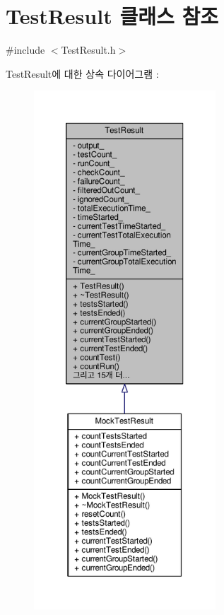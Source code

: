 \hypertarget{class_test_result}{}\section{Test\+Result 클래스 참조}
\label{class_test_result}


{\ttfamily \#include $<$Test\+Result.\+h$>$}



Test\+Result에 대한 상속 다이어그램 \+: 
\nopagebreak
\begin{figure}[H]
\begin{center}
\leavevmode
\includegraphics[height=550pt]{class_test_result__inherit__graph}
\end{center}
\end{figure}



